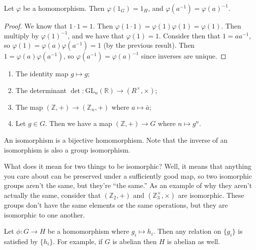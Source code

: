 \begin{lemma}
Let $\varphi$ be a homomorphism. Then $\varphi(1_G) = 1_H$, and $\varphi(a^{-1}) = \varphi(a)^{-1}$.
\end{lemma}

\begin{proof}
We know that $1 \cdot 1 = 1$. Then $\varphi(1 \cdot 1) = \varphi(1)\varphi(1) = \varphi(1)$. Then multiply by $\varphi(1)^{-1}$, and we have that $\varphi(1) = 1$. Consider then that $1 = aa^{-1}$, so $\varphi(1) = \varphi(a)\varphi(a^{-1}) = 1$ (by the previous result). Then $1 = \varphi(a)\varphi(a^{-1})$, so $\varphi(a^{-1}) = \varphi(a)^{-1}$ since inverses are unique.
\end{proof}

\begin{example}
\begin{enumerate}
\item The identity map $g \mapsto g$;
\item The determinant $\det : \mathrm{GL}_n(\mathbb{R}) \to (R^\times, \times)$;
\item The map $(\mathbb{Z}, +) \to (\mathbb{Z}_n, +)$ where $a \mapsto \bar{a}$;
\item Let $g \in G$. Then we have a map $(\mathbb{Z}, +) \to G$ where $n \mapsto g^n$.
\end{enumerate}
\end{example}

\begin{definition}[Isomorphism]
An isomorphism is a bijective homomorphism. Note that the inverse of an isomorphism is also a group isomorphism.
\end{definition}

What does it mean for two things to be isomorphic? Well, it means that anything you care about can be preserved under a sufficiently good map, so two isomorphic groups aren't the same, but they're ``the same.'' As an example of why they aren't actually the same, consider that $(\mathbb{Z}_2, +)$ and $(\mathbb{Z}_3^\times, \times)$ are isomorphic. These groups don't have the same elements or the same operations, but they are isomorphic to one another.

\begin{lemma}
Let $\phi : G \to H$ be a homomorphism where $g_i \mapsto h_i$. Then any relation on $\{g_i\}$ is satisfied by $\{h_i\}$. For example, if $G$ is abelian then $H$ is abelian as well.
\end{lemma}

